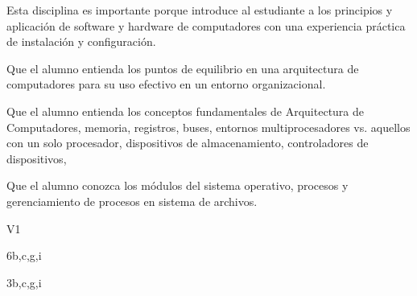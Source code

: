 \begin{syllabus}


\begin{justification}
    Esta disciplina es importante porque introduce al estudiante a los principios y aplicación de software y hardware de computadores con una experiencia práctica de instalación y configuración.
    \end{justification}
    
    \begin{goals}
    \item Que el alumno entienda los puntos de equilibrio en una arquitectura de computadores para su uso efectivo en un entorno organizacional.
    \item Que el alumno entienda los conceptos fundamentales de Arquitectura de Computadores, memoria, registros, buses, entornos multiprocesadores vs. aquellos con un solo procesador, dispositivos de almacenamiento, controladores de dispositivos, 
    \item Que el alumno conozca los módulos del sistema operativo, procesos y gerenciamiento de procesos en sistema de archivos.
    \end{goals}
    
    \begin{outcomes}{V1}
        \item {}
        \item {}
        \item {}
        \item {}
    \end{outcomes}
    
    \begin{unit}{\LUSIXDef}{}{\LUSIXBib}{6}{b,c,g,i}
    
    \end{unit}
    
    \begin{unit}{\LUSEVENDef}{}{\LUSEVENBib}{3}{b,c,g,i}
    
    \end{unit}
    
    
    \begin{coursebibliography}
    \end{coursebibliography}
    
    \end{syllabus}
    